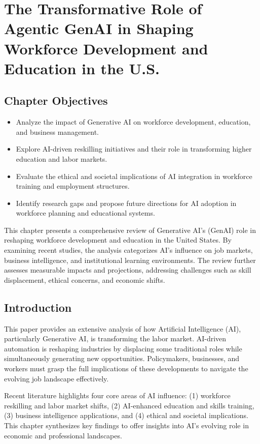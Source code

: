 \documentclass[a4paper,headinclude=on,footinclude=on,12pt,oneside]{scrbook}
\begin{document}
\chapter{The Transformative Role of Agentic GenAI in Shaping Workforce Development and Education in the U.S.}

\section*{Chapter Objectives}
\begin{itemize}
	\item Analyze the impact of Generative AI on workforce development, education, and business management.
	\item Explore AI-driven reskilling initiatives and their role in transforming higher education and labor markets.
	\item Evaluate the ethical and societal implications of AI integration in workforce training and employment structures.
	\item Identify research gaps and propose future directions for AI adoption in workforce planning and educational systems.
\end{itemize}

This chapter presents a comprehensive review of Generative AI's (GenAI) role in reshaping workforce development and education in the United States. By examining recent studies, the analysis categorizes AI's influence on job markets, business intelligence, and institutional learning environments. The review further assesses measurable impacts and projections, addressing challenges such as skill displacement, ethical concerns, and economic shifts.

\section*{Introduction}

This paper provides an extensive analysis of how Artificial Intelligence (AI), particularly Generative AI, is transforming the labor market. AI-driven automation is reshaping industries by displacing some traditional roles while simultaneously generating new opportunities. Policymakers, businesses, and workers must grasp the full implications of these developments to navigate the evolving job landscape effectively.

Recent literature highlights four core areas of AI influence: (1) workforce reskilling and labor market shifts, (2) AI-enhanced education and skills training, (3) business intelligence applications, and (4) ethical and societal implications. This chapter synthesizes key findings to offer insights into AI’s evolving role in economic and professional landscapes.
\end{document}

